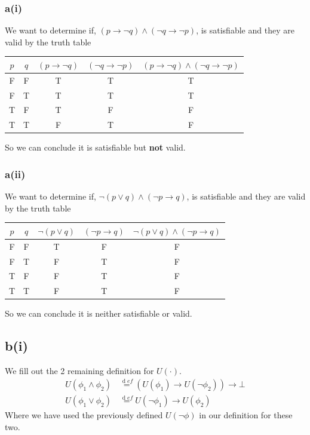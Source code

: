 \documentclass[12pt]{article}
\begin{document}
\subsubsection*{a(i)}
We want to determine if, $(p\to \neg q)\land (\neg q\to \neg p)$, is satisfiable and they are valid by the truth table
\begin{center}
\begin{tabular}{|c|c||c|c||c|}
\hline 
$p$ & $q$ & $(p\to \neg q)$ & $(\neg q\to \neg p)$ & $(p\to \neg q)\land (\neg q\to \neg p)$\\ 
\hline 
F & F & T & T & T\\ 
\hline 
F & T & T & T & T\\ 
\hline 
T & F & T & F & F\\ 
\hline
T & T & F & T & F\\ 
\hline
\end{tabular} 
\end{center}
So we can conclude it is satisfiable but \textbf{not} valid.

\subsubsection*{a(ii)}
We want to determine if, $\neg(p\lor q)\land (\neg p\to q)$, is satisfiable and they are valid by the truth table
\begin{center}
\begin{tabular}{|c|c||c|c||c|}
\hline 
$p$ & $q$ & $\neg(p\lor q)$ & $(\neg p\to q)$ & $\neg(p\lor q)\land (\neg p\to q)$\\ 
\hline 
F & F & T & F & F\\ 
\hline 
F & T & F & T & F\\ 
\hline 
T & F & F & T & F\\ 
\hline
T & T & F & T & F\\ 
\hline
\end{tabular} 
\end{center}
So we can conclude it is neither satisfiable or valid.

\subsection*{b(i)}
We fill out the 2 remaining definition for $U(\cdot)$.
\begin{align*}
U(\phi_1\land \phi_2) &\stackrel{\mathop def}= (U(\phi_1)\to U(\neg\phi_2))\to\bot \\
U(\phi_1\lor \phi_2) &\stackrel{\mathop def}=  U(\neg\phi_1)\to U(\phi_2)
\end{align*}
Where we have used the previously defined $U(\neg\phi)$ in our definition for these two.
\end{document}
